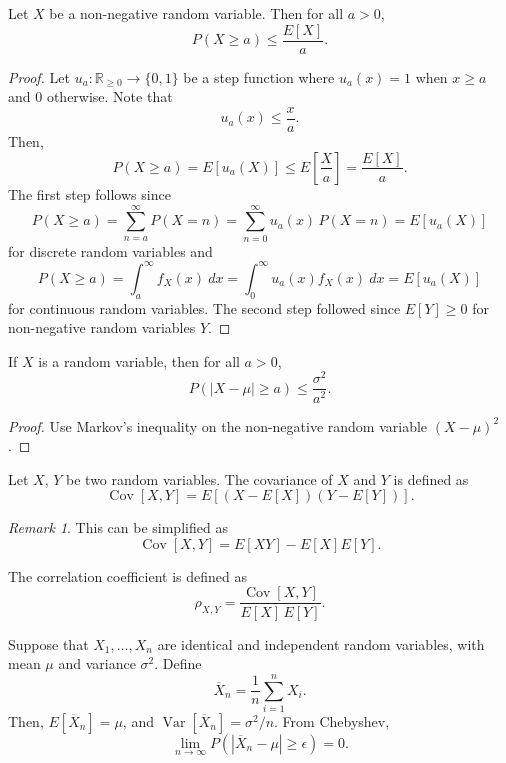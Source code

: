 \documentclass[11pt]{article}
\def\R{\mathbb{R}}
\newcommand\E[1]{E\left[#1\right]}
\newcommand\var[1]{\operatorname{Var}[#1]}
\newcommand\cov[1]{\operatorname{Cov}[#1]}
\theoremstyle{definition}
\theoremstyle{remark}
\newtheorem*{remark}{Remark}
\numberwithin{equation}{module}
\begin{document}
    \begin{theorem}
        Let $X$ be a non-negative random variable. Then for all $a > 0$, \[
            P(X \geq a) \leq \frac{\E{X}}{a}.
        \] 
    \end{theorem}
    \begin{proof}
        Let $u_a\colon \R_{\geq 0} \to \{0, 1\}$ be a step function where
        $u_a(x) = 1$ when $x \geq a$ and $0$ otherwise. Note that \[
            u_a(x) \leq \frac{x}{a}.
        \] Then, \[
            P(X \geq a) = \E{u_a(X)} \leq \E{\frac{X}{a}} = \frac{\E{X}}{a}.
        \] The first step follows since \[
            P(X \geq a) = \sum_{n = a}^\infty P(X = n) = \sum_{n = 0}^\infty
            u_a(x)\,P(X = n) = \E{u_a(X)}
        \] for discrete random variables and \[
            P(X \geq a) = \int_a^\infty f_X(x)\:dx = \int_{0}^{\infty}
            u_a(x)f_X(x)\:dx = \E{u_a(X)}
        \] for continuous random variables.
        The second step followed since $\E{Y} \geq 0$ for non-negative random
        variables $Y$.
    \end{proof}
    \begin{corollary}
        If $X$ is a random variable, then for all $a > 0$, \[
            P(|X - \mu| \geq a) \leq \frac{\sigma^2}{a^2}.
        \] 
    \end{corollary}
    \begin{proof}
        Use Markov's inequality on the non-negative random variable $(X - \mu)^2$.
    \end{proof}

    \begin{definition}[Covariance]
        Let $X$, $Y$ be two random variables. The covariance of $X$ and $Y$ is
        defined as \[
            \cov{X, Y} = \E{(X - \E{X})(Y - \E{Y})}.
        \] 
        \begin{remark}
            This can be simplified as \[
                \cov{X, Y} = \E{XY} - \E{X}\E{Y}.
            \] 
        \end{remark}
    \end{definition}

    \begin{definition}
        The correlation coefficient is defined as \[
            \rho_{X, Y} = \frac{\cov{X, Y}}{\E{X}\, \E{Y}}.
        \]
    \end{definition}

    \begin{theorem}
        Suppose that $X_1, \dots, X_n$ are identical and independent random
        variables, with mean $\mu$ and variance $\sigma^2$. Define \[
            \overline{X}_n = \frac{1}{n}\sum_{i = 1}^n X_i.
        \] Then, $\E{\overline{X}_n} = \mu$, and $\var{\overline{X}_n} = \sigma^2 /
        n$. From Chebyshev, \[
            \lim_{n \to \infty} P(|\overline{X}_n - \mu| \geq \epsilon) = 0.
        \] 
    \end{theorem}
\end{document}
